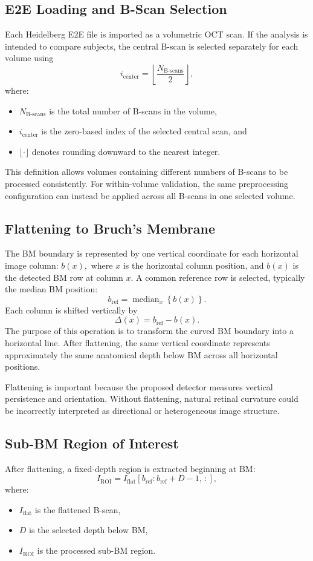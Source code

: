 \documentclass[11pt]{article}
\begin{document}
\subsection{E2E Loading and B-Scan Selection}
Each Heidelberg E2E file is imported as a volumetric OCT scan. If the analysis
is intended to compare subjects, the central B-scan is selected separately for
each volume using
\[
i_{\mathrm{center}}
=
\left\lfloor
\frac{N_{\mathrm{B\text{-}scans}}}{2}
\right\rfloor,
\]
where:
\begin{itemize}
    \item \(N_{\mathrm{B\text{-}scans}}\) is the total number of B-scans in the
    volume,
    \item \(i_{\mathrm{center}}\) is the zero-based index of the selected
    central scan, and
    \item \(\lfloor \cdot \rfloor\) denotes rounding downward to the nearest
    integer.
\end{itemize}
This definition allows volumes containing different numbers of B-scans to be
processed consistently. For within-volume validation, the same preprocessing
configuration can instead be applied across all B-scans in one selected
volume.

\subsection{Flattening to Bruch's Membrane}
The BM boundary is represented by one vertical coordinate for each horizontal
image column: $b(x),$ where \(x\) is the horizontal column position, and \(b(x)\) is the detected BM row at column \(x\).
A common reference row is selected, typically the median BM position:
\[
b_{\mathrm{ref}}
=
\operatorname{median}_{x}
\left\{
b(x)
\right\}.
\]
Each column is shifted vertically by
\[
\Delta(x)
=
b_{\mathrm{ref}}-b(x).
\]
The purpose of this operation is to transform the curved BM boundary into a
horizontal line. After flattening, the same vertical coordinate represents
approximately the same anatomical depth below BM across all horizontal
positions.

Flattening is important because the proposed detector measures vertical
persistence and orientation. Without flattening, natural retinal curvature
could be incorrectly interpreted as directional or heterogeneous image
structure.


\subsection{Sub-BM Region of Interest}
After flattening, a fixed-depth region is extracted beginning at BM:
\[
I_{\mathrm{ROI}}
=
I_{\mathrm{flat}}
\left[
b_{\mathrm{ref}}:
b_{\mathrm{ref}}+D-1,\,
:
\right],
\]
where:
\begin{itemize}
    \item \(I_{\mathrm{flat}}\) is the flattened B-scan,
    \item \(D\) is the selected depth below BM,
    \item \(I_{\mathrm{ROI}}\) is the processed sub-BM region.
\end{itemize}
\end{document}

